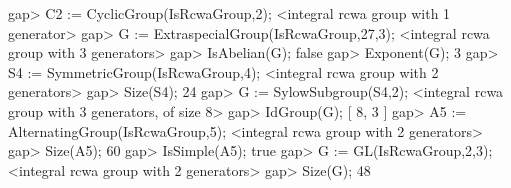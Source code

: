 \beginexample
gap> C2 := CyclicGroup(IsRcwaGroup,2);
<integral rcwa group with 1 generator>
gap> G := ExtraspecialGroup(IsRcwaGroup,27,3);
<integral rcwa group with 3 generators>
gap> IsAbelian(G);
false
gap> Exponent(G);
3
gap> S4 := SymmetricGroup(IsRcwaGroup,4);
<integral rcwa group with 2 generators>
gap> Size(S4);
24
gap> G := SylowSubgroup(S4,2);
<integral rcwa group with 3 generators, of size 8>
gap> IdGroup(G);
[ 8, 3 ]
gap> A5 := AlternatingGroup(IsRcwaGroup,5);
<integral rcwa group with 2 generators>
gap> Size(A5);
60
gap> IsSimple(A5);
true
gap> G := GL(IsRcwaGroup,2,3);
<integral rcwa group with 2 generators>
gap> Size(G);
48
\endexample

